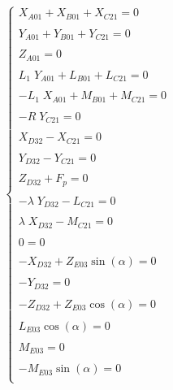 \documentclass[10pt,fleqn]{article} %
\begin{document}
\begin{multicols}{2}
\begin{multicols}{2}
\begin{align*}
\begin{array}{c}
\end{array}
\left\{
\begin{array}{c}
X_{A01}+X_{B01}+X_{C21}=0 \\ 
\\
Y_{A01}+Y_{B01}+Y_{C21}=0 \\ 
 \\ 
Z_{A01}=0 \\ 
\\
L_1\;Y_{A01}+L_{B01}+L_{C21}=0 \\ 
\\
-L_1\;X_{A01}+M_{B01}+M_{C21}=0 \\ 
 \\ 
-R\;Y_{C21} =0\\
\\
X_{D32}-X_{C21}=0 \\ 
\\
Y_{D32}-Y_{C21}=0 \\ 
 \\ 
Z_{D32}+F_p=0 \\ 
\\
-\lambda\;Y_{D32}-L_{C21}=0 \\ 
\\
\lambda\;X_{D32}-M_{C21}=0 \\ 
 \\ 
0 =0\\
\\
-X_{D32}+Z_{E03}\sin(\alpha)=0 \\ 
\\
-Y_{D32}=0 \\ 
 \\ 
-Z_{D32}+Z_{E03}\cos(\alpha)=0 \\ 
\\
L_{E03}\cos(\alpha)=0 \\ 
\\
M_{E03}=0\\ 
 \\ 
-M_{E03}\sin(\alpha)=0\\ 
\end{array}\right.
\end{align*}


\end{multicols}
\end{multicols}
\end{document}
